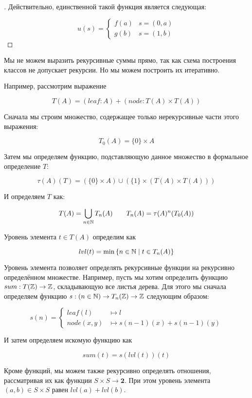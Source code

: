 \documentclass[10pt, a4paper]{article}
\theoremstyle{colon}
\begin{document}
\begin{proof}[\unskip\indent\nopunct]
Действительно, единственной такой функция является следующая:

\[
u(s) = \begin{cases}
f(a) &s = (0, a) \\
g(b) &s = (1, b)
\end{cases}
\]
\end{proof}

Мы не можем выразить рекурсивные суммы прямо, так как схема построения классов не допускает рекурсии.
Но мы можем построить их итеративно.

Например, рассмотрим выражение

\[
T(A) = (leaf: A) + (node: T(A) \times T(A))
\]

Сначала мы строим множество, содержащее только нерекурсивные части этого выражения:

\[
T_0(A) = \{0\} \times A
\]

Затем мы определяем функцию, подставляющую данное множество в формальное определение \( T \):

\[
\tau(A)(T) = (\{0\} \times A) \cup (\{1\} \times (T(A) \times T(A)))
\]

И определяем \( T \) как:

\[
T(A) = \bigcup_{n \in \Bbb N} T_n(A) \qquad T_n(A) = \tau(A)^{n} (T_0(A))
\]

Уровень элемента \( t \in T(A) \) определим как

\[
lvl(t) = \min\,\{n \in \Bbb N \mid t \in T_n(A)\}
\]

Уровень элемента позволяет определять рекурсивные функции на рекурсивно определённом множестве. Например,
пусть мы хотим определить функцию \( sum: T(\Bbb Z) \to \Bbb Z \), складывающую все листья
дерева. Для этого мы сначала определяем функцию \( s: (n \in \Bbb N) \to T_n(\Bbb Z) \to \Bbb Z \) следующим образом:

\[
s(n) = \begin{cases}
leaf(l) &\mapsto l \\
node(x, y) &\mapsto s(n - 1)(x) + s(n - 1)(y) 
\end{cases}
\]

И затем определяем искомую функцию как

\[
sum(t) = s(lvl(t))(t)
\]

Кроме функций, мы можем также рекурсивно определять отношения, рассматривая их как
функции \( S \times S \to \bm 2 \). При этом уровень
элемента \( (a, b) \in S \times S \) равен \( lvl(a) + lvl(b) \).
\end{document}
